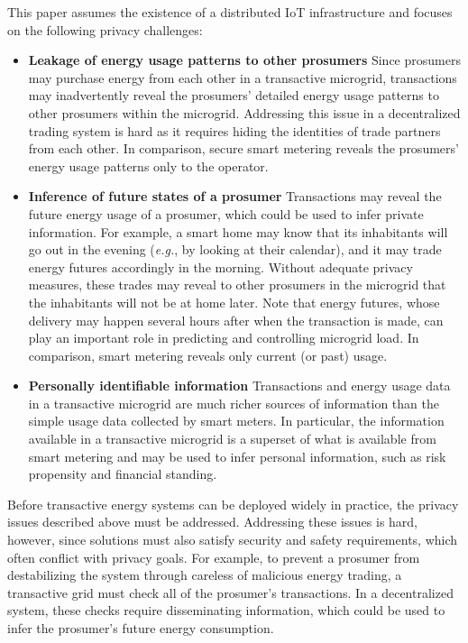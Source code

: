 This paper assumes the existence of a distributed IoT infrastructure
and focuses on the following privacy challenges:
\begin{itemize}[itemsep=0.1\parskip,topsep=-0.75\parskip]
\item \textbf{Leakage of energy usage patterns to other prosumers}
  Since prosumers may purchase energy from each other in a transactive
  microgrid, transactions may inadvertently reveal the prosumers'
  detailed energy usage patterns to other prosumers within the
  microgrid.  Addressing this issue in a decentralized trading system
  is hard as it requires hiding the identities of trade partners from
  each other. In comparison, secure smart metering reveals the
  prosumers' energy usage patterns only to the operator.

\item \textbf{Inference of future states of a prosumer} Transactions
  may reveal the future energy usage of a prosumer, which could be
  used to infer private information.  For example, a smart home may
  know that its inhabitants will go out in the evening (\emph{e.g.},
  by looking at their calendar), and it may trade energy futures
  accordingly in the morning.  Without adequate privacy measures,
  these trades may reveal to other prosumers in the microgrid that the
  inhabitants will not be at home later.  Note that energy futures,
  whose delivery may happen several hours after when the transaction
  is made, can play an important role in predicting and controlling
  microgrid load.  In comparison, smart metering reveals only current
  (or past) usage.

\item \textbf{Personally identifiable information} Transactions and
  energy usage data in a transactive microgrid are much richer sources
  of information than the simple usage data collected by smart meters.
  In particular, the information available in a transactive microgrid
  is a superset of what is available from smart metering and may be
  used to infer personal information, such as risk propensity and
  financial standing.
\end{itemize}
\vspace{0.5\parskip}

Before transactive energy systems can be deployed widely in practice,
the privacy issues described above must be addressed.  Addressing
these issues is hard, however, since solutions must also satisfy
security and safety requirements, which often conflict with privacy
goals.  For example, to prevent a prosumer from destabilizing the
system through careless of malicious energy trading, a transactive
grid must check all of the prosumer's transactions.  In a
decentralized system, these checks require disseminating information,
which could be used to infer the prosumer's future energy consumption.

